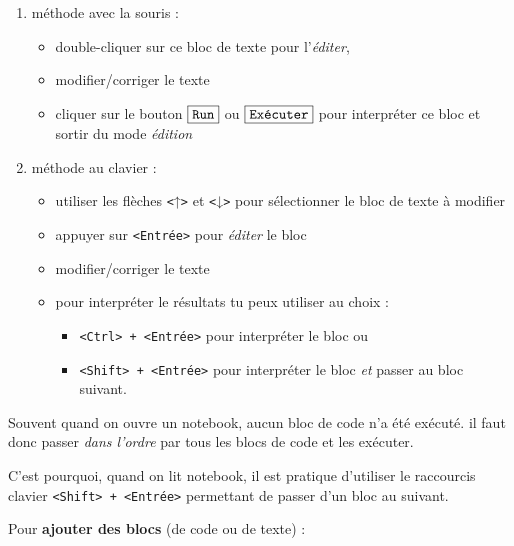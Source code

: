 \documentclass[a4paper,17pt]{extarticle}
\providecommand{\tightlist}{%
      \setlength{\itemsep}{0pt}\setlength{\parskip}{0pt}}
\begin{document}
\begin{enumerate}
\def\labelenumi{\arabic{enumi}.}
\tightlist
\item
  méthode avec la souris :

  \begin{itemize}
  \tightlist
  \item
    double-cliquer sur ce bloc de texte pour l'\emph{éditer},
  \item
    modifier/corriger le texte
  \item
    cliquer sur le bouton \(\fbox{\texttt{Run}}\) ou
    \(\fbox{\texttt{Exécuter}}\) pour interpréter ce bloc et sortir du
    mode \emph{édition}
  \end{itemize}
\item
  méthode au clavier :

  \begin{itemize}
  \tightlist
  \item
    utiliser les flèches \texttt{\textless{}}↑\texttt{\textgreater{}} et
    \texttt{\textless{}}↓\texttt{\textgreater{}} pour sélectionner le
    bloc de texte à modifier
  \item
    appuyer sur \texttt{\textless{}Entrée\textgreater{}} pour
    \emph{éditer} le bloc
  \item
    modifier/corriger le texte
  \item
    pour interpréter le résultats tu peux utiliser au choix :

    \begin{itemize}
    \tightlist
    \item
      \texttt{\textless{}Ctrl\textgreater{}\ +\ \textless{}Entrée\textgreater{}}
      pour interpréter le bloc ou
    \item
      \texttt{\textless{}Shift\textgreater{}\ +\ \textless{}Entrée\textgreater{}}
      pour interpréter le bloc \emph{et} passer au bloc suivant.
    \end{itemize}
  \end{itemize}
\end{enumerate}
\begin{remarque}
    Souvent quand on ouvre un notebook, aucun bloc de code n'a été exécuté.
il faut donc passer \emph{dans l'ordre} par tous les blocs de code et
les exécuter.

C'est pourquoi, quand on lit notebook, il est pratique d'utiliser le
raccourcis clavier
\texttt{\textless{}Shift\textgreater{}\ +\ \textless{}Entrée\textgreater{}}
permettant de passer d'un bloc au suivant.

        \end{remarque}
    Pour \textbf{ajouter des blocs} (de code ou de texte) :
\end{document}

